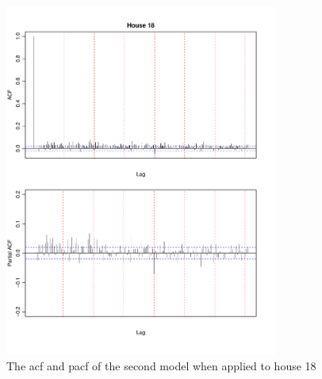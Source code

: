 \begin{figure}[H]
    \centering
    \includegraphics[width=0.8\textwidth]{../../../figures/arimax/ACF_18_long.pdf}
    \caption{The acf and pacf of the second model when applied to house 18}
    \label{fig:Model2_acf_18_long}
\end{figure}    
